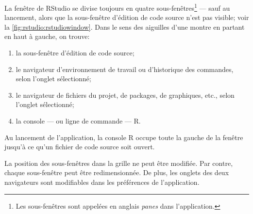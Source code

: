 La fenêtre de RStudio se divise toujours en quatre
sous-fenêtres\footnote{%
  Les sous-fenêtres sont appelées en anglais \emph{panes} dans
  l'application.} %
--- sauf au lancement, alors que la sous-fenêtre d'édition de code
source n'est pas visible; voir la \autoref{fig:rstudio:rstudiowindow}.
Dans le sens des aiguilles d'une montre en partant en haut à gauche,
on trouve:
\begin{enumerate}
\item la sous-fenêtre d'édition de code source;
\item le navigateur d'environnement de travail ou d'historique des
  commandes, selon l'onglet sélectionné;
\item le navigateur de fichiers du projet, de packages, de graphiques,
  etc., selon l'onglet sélectionné;
\item la console --- ou ligne de commande --- R.
\end{enumerate}
Au lancement de l'application, la console R occupe toute la gauche de
la fenêtre jusqu'à ce qu'un fichier de code source soit ouvert.

La position des sous-fenêtres dans la grille ne peut être modifiée.
Par contre, chaque sous-fenêtre peut être redimensionnée. De plus, les
onglets des deux navigateurs sont modifiables dans les préférences de
l'application.


